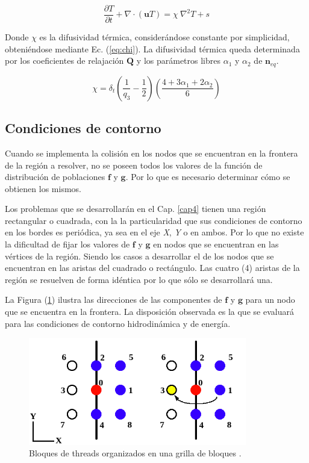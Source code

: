 \begin{equation}
    \frac{\partial T}{\partial t} + \nabla \cdot ( \mathbf{u} T ) = \chi \> {\nabla }^{2} T + s
\end{equation}

Donde $\chi$ es la difusividad térmica, considerándose constante por simplicidad, obteniéndose mediante Ec. (\ref{eq:chi}). La difusividad térmica queda determinada por los coeficientes de relajación $\mathbf{Q}$ y los parámetros libres $\alpha_{1}$ y $\alpha_{2}$ de ${\textbf{n}}_{eq}$.

\begin{equation}
    \chi = \delta_{t} \left( \frac{1}{q_{3}} - \frac{1}{2} \right) \left( \frac{ 4 + 3 \alpha_{1} + 2 \alpha_{2}}{6} \right)
    \label{eq:chi}
\end{equation}

\subsection{Condiciones de contorno}

Cuando se implementa la colisión en los nodos que se encuentran en la frontera de la región a resolver, no se poseen todos los valores de la función de distribución de poblaciones $\mathbf{f}$ y $\mathbf{g}$. Por lo que es necesario determinar cómo se obtienen los mismos. 

Los problemas que se desarrollarán en el Cap. \ref{cap4} tienen una región rectangular o cuadrada, con la la particularidad que sus  condiciones de contorno en los bordes es periódica, ya sea en el eje \textit{X}, \textit{Y} o en ambos. Por lo que no existe la dificultad de fijar los valores de $\mathbf{f}$ y $\mathbf{g}$ en nodos que se encuentran en las vértices de la región. Siendo los casos a desarrollar  el de los nodos que se encuentran en las aristas del cuadrado o rectángulo. Las cuatro (4) aristas de la región se resuelven de forma idéntica por lo que sólo se  desarrollará una.

La Figura (\ref{fig:CC_hidro}) ilustra las direcciones de las componentes de $\mathbf{f}$ y $\mathbf{g}$ para un nodo que se encuentra en la frontera. La disposición observada es la que se evaluará para las condiciones de contorno hidrodinámica y de energía.  

\begin{figure}[h!]
	\centering
	\includegraphics[width=0.85\textwidth]{figs/cap2/CC_hidrodinamica.png}
	\caption{Bloques de threads organizados en una grilla de bloques \cite{rinaldi2011modelos}.}
	\label{fig:CC_hidro}
\end{figure}

